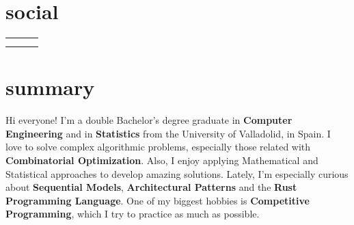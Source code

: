 \documentclass{friggeri-cv}
\newcommand{\myhref}[2]{\href[pdfnewwindow=true]{#1}{#2}}
\begin{document}


  \section{social}

    \vspace{-1.5em}
    \begin{center}
      \renewcommand{\arraystretch}{1.5}
      \begin{tabular}{ p{16em} p{17em} p{16em} }
        \myhref{https://garciparedes.me}{\faHome\quad Website: garciparedes.me}
        &
        \myhref{mailto:sergio@garciparedes.me}{\faEnvelope\quad Email: sergio@garciparedes.me}
        &
        \myhref{https://es.linkedin.com/in/garciparedes/en}{\faLinkedin\quad LinkedIn: Sergio García Prado}
        \\

        \myhref{https://github.com/garciparedes}{\faGithub\quad GitHub: @garciparedes}
        &
        \myhref{https://scholar.google.es/citations?user=X3Mb7BAAAAAJ}{\faGraduationCap\quad Scholar: Sergio García Prado}
        &
        \myhref{https://stackoverflow.com/users/3921457/garciparedes}{\faStackOverflow\quad StackOverflow: @garciparedes}
        \\
      \end{tabular}
    \end{center}




  \section{summary}

  Hi everyone! I'm a double Bachelor's degree graduate in \textbf{Computer Engineering} and in \textbf{Statistics} from the University of Valladolid, in Spain. I love to solve complex algorithmic problems, especially those related with \textbf{Combinatorial Optimization}. Also, I enjoy applying Mathematical and Statistical approaches to develop amazing solutions. Lately, I'm especially curious about \textbf{Sequential Models}, \textbf{Architectural Patterns} and the \textbf{Rust Programming Language}. One of my biggest hobbies is \textbf{Competitive Programming}, which I try to practice as much as possible.
\end{document}
